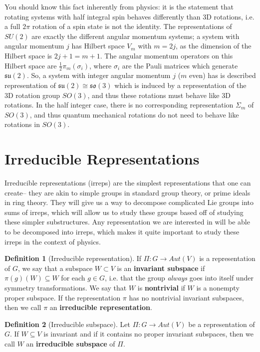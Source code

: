 \documentclass[11pt, oneside]{article}   	%
\theoremstyle{definition}
\newtheorem{definition}{Definition}[section]
\begin{document}
You should know this fact inherently from physics: it is the statement that rotating systems with half integral spin behaves 
differently than 3D rotations, i.e. a full $2\pi$ rotation of a spin state is not the identity. The representations of $SU(2)$ are 
exactly the different angular momentum systems; a system with angular momentum $j$ has Hilbert space $V_m$ with 
$m = 2j$, as the dimension of the Hilbert space is $2j + 1 = m + 1$. The angular momentum operators on this Hilbert space 
are $\frac{1}{2}\pi_m(\sigma_i)$, where $\sigma_i$ are the Pauli matrices which generate $\mathfrak{su}(2)$. So, a system 
with integer angular momentum $j$ ($m$ even) has is described representation of $\mathfrak{su}(2)\cong\mathfrak{so}(3)$ 
which is induced by a representation of the 3D rotation group $SO(3)$, and thus these rotations must behave like 3D rotations. 
In the half integer case, there is no corresponding representation $\Sigma_m$ of $SO(3)$, and thus quantum mechanical 
rotations do not need to behave like rotations in $SO(3)$. 

\newpage
\section{Irreducible Representations}

Irreducible representations (irreps) are the simplest representations that one can create-- they are 
akin to simple groups in standard group theory, or prime ideals in ring theory. They will give us a way 
to decompose complicated Lie groups into sums of irreps, which will allow us to study these groups based 
off of studying these simpler substructures. Any representation we are interested in will be able to be 
decomposed into irreps, which makes it quite important to study these irreps in the context of physics. 

\begin{definition}[Irreducible representation]
If $\Pi : G\rightarrow Aut(V)$ is a representation of $G$, we say that a subspace $W\subset V$ is 
an \textbf{invariant subspace} if $\pi(g)(W)\subseteq W$ for each $g\in G$, i.e. that the group 
\textit{always} goes into itself under symmetry transformations. We say that $W$ is \textbf{nontrivial} 
if $W$ is a nonempty proper subspace. If the representation $\pi$ has no nontrivial invariant subspaces, 
then we call $\pi$ an \textbf{irreducible representation}. 
\end{definition}

\begin{definition}[Irreducible subspace]
	Let $\Pi : G\rightarrow Aut(V)$ be a representation of $G$. If $W\subseteq V$ is invariant and if 
	it contains no proper invariant subspaces, then we call $W$ an \textbf{irreducible subspace} of 
	$\Pi$. 
\end{definition}
\end{document}
